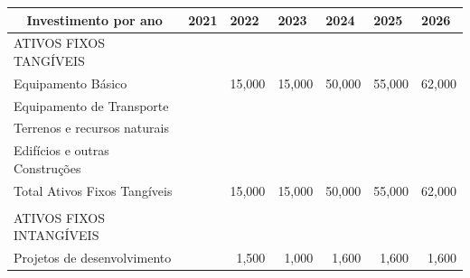 \documentclass[11pt]{article}
\begin{document}
	\begin{center}
		\begin{tabular}{|l|l|r|r|r|r|r|}
			\hline
			\multicolumn{1}{|c|}{Investimento por ano}           & 2021 & \multicolumn{1}{l|}{2022} & \multicolumn{1}{l|}{2023} & \multicolumn{1}{l|}{2024} & \multicolumn{1}{l|}{2025} & \multicolumn{1}{l|}{2026} \\ \hline
			ATIVOS FIXOS TANGÍVEIS                               &      &                           &                           &                           &                           &                           \\ \hline
			Equipamento Básico                                   &      & 15,000                    & 15,000                    & 50,000                    & 55,000                    & 62,000                    \\ \hline
			Equipamento de Transporte                            &      &                           &                           &                           &                           &                           \\ \hline
			Terrenos e recursos naturais                         &      &                           &                           &                           &                           &                           \\ \hline
			Edifícios e outras Construções                       &      &                           &                           &                           &                           &                           \\ \hline
			Total Ativos Fixos Tangíveis                         &      & 15,000                    & 15,000                    & 50,000                    & 55,000                    & 62,000                    \\ \hline
			\multicolumn{1}{l}{} & \multicolumn{1}{l}{} & \multicolumn{1}{l}{} & \multicolumn{1}{l}{} & \multicolumn{1}{l}{} & \multicolumn{1}{l}{} & \multicolumn{1}{l}{} \\ \hline
			ATIVOS FIXOS INTANGÍVEIS                             &      &                           &                           &                           &                           &                           \\ \hline
			Projetos de desenvolvimento                          &      & 1,500                     & 1,000                     & 1,600                     & 1,600                     & 1,600                     \\ \hline

\end{tabular}
\end{center}
\end{document}
